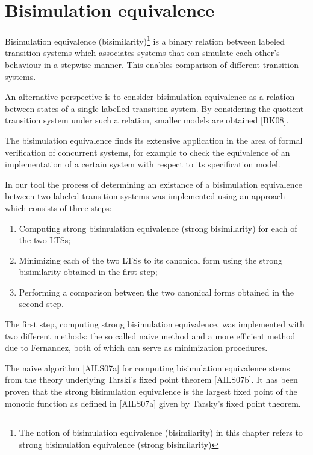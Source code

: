 \section{Bisimulation equivalence}
Bisimulation equivalence (bisimilarity)\footnote{The notion of bisimulation equivalence (bisimilarity) in this chapter 
refers to strong bisimulation equivalence (strong bisimilarity)} is a binary relation between labeled transition systems 
which associates systems that can simulate each other's behaviour in a stepwise manner. This enables comparison of 
different transition systems.

An alternative perspective is to consider bisimulation equivalence as a relation between states of a single labelled 
transition system. By considering the quotient transition system under such a relation, smaller models are obtained
[BK08].

The bisimulation equivalence finds its extensive application in the area of formal verification of concurrent systems,
for example to check the equivalence of an implementation of a certain system with respect to its specification model.

In our tool the process of determining an existance of a bisimulation equivalence 
between two labeled transition systems was implemented using an approach which consists of three steps:

\begin{enumerate}
\item Computing strong bisimulation equivalence (strong bisimilarity) for each of the two LTSs;
\item Minimizing each of the two LTSs to its canonical form using the strong bisimilarity obtained
in the first step;
\item Performing a comparison between the two canonical forms obtained in the second step.
\end{enumerate}

The first step, computing strong bisimulation equivalence, was implemented with two different methods: the so called
naive method and a more efficient method due to Fernandez, both of which can serve as minimization procedures.

The naive algorithm [AILS07a] for computing bisimulation equivalence stems from the theory underlying Tarski's fixed point
theorem [AILS07b]. It has been proven that the strong bisimulation equivalence is the largest fixed point of the 
monotic function  as defined in [AILS07a] given by Tarsky's fixed point theorem. 

